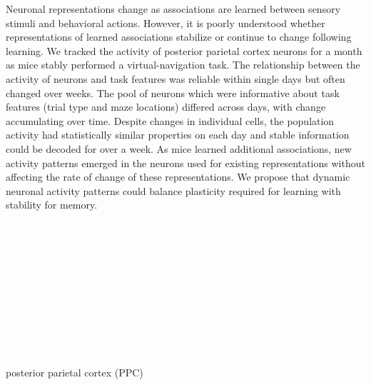 
\noindent Neuronal representations change as associations are learned between sensory stimuli and behavioral actions. However, it is poorly understood whether representations of learned associations stabilize or continue to change following learning. We tracked the activity of posterior parietal cortex neurons for a month as mice stably performed a virtual-navigation task. The relationship between the activity of neurons and task features was reliable within single days but often changed over weeks. The pool of neurons which were informative about task features (trial type and maze locations) differed across days, with change accumulating over time. Despite changes in individual cells, the population activity had statistically similar properties on each day and stable information could be decoded for over a week. As mice learned additional associations, new activity patterns emerged in the neurons used for existing representations without affecting the rate of change of these representations. We propose that dynamic neuronal activity patterns could balance plasticity required for learning with stability for memory.
\\
\\
\\
\\
\\
\\
\\
\\
\\
\\
\\
\\
posterior parietal cortex (PPC)




